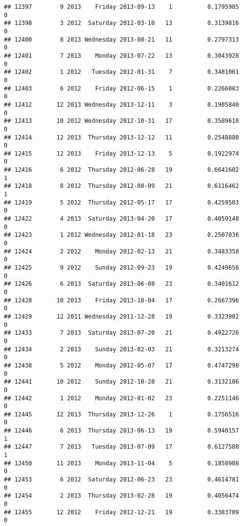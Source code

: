 \documentclass[
]{article}
\begin{document}
\begin{verbatim}
## 12397        9 2013    Friday 2013-09-13    1          0.1795985             0
## 12398        3 2012  Saturday 2012-03-10   13          0.3139816             0
## 12400        8 2013 Wednesday 2013-08-21   11          0.2797313             0
## 12401        7 2013    Monday 2013-07-22   13          0.3043928             0
## 12402        1 2012   Tuesday 2012-01-31    7          0.3481061             0
## 12403        6 2012    Friday 2012-06-15    1          0.2266083             0
## 12412       12 2013 Wednesday 2013-12-11    3          0.1905840             0
## 12413       10 2012 Wednesday 2012-10-31   17          0.3589618             0
## 12414       12 2013  Thursday 2013-12-12   11          0.2548880             0
## 12415       12 2013    Friday 2013-12-13    5          0.1922974             0
## 12416        6 2012  Thursday 2012-06-28   19          0.6641602             1
## 12418        8 2012  Thursday 2012-08-09   21          0.6116462             1
## 12419        5 2012  Thursday 2012-05-17   17          0.4259503             0
## 12422        4 2013  Saturday 2013-04-20   17          0.4059140             0
## 12423        1 2012 Wednesday 2012-01-18   23          0.2507836             0
## 12424        2 2012    Monday 2012-02-13   21          0.3483358             0
## 12425        9 2012    Sunday 2012-09-23   19          0.4249656             0
## 12426        6 2013  Saturday 2013-06-08   23          0.3401612             0
## 12428       10 2013    Friday 2013-10-04   17          0.2667396             0
## 12429       12 2011 Wednesday 2011-12-28   19          0.3323902             0
## 12433        7 2013  Saturday 2013-07-20   21          0.4922726             0
## 12434        2 2013    Sunday 2013-02-03   21          0.3213274             0
## 12438        5 2012    Monday 2012-05-07   17          0.4747298             0
## 12441       10 2012    Sunday 2012-10-28   21          0.3132186             0
## 12442        1 2012    Monday 2012-01-02   23          0.2251146             0
## 12445       12 2013  Thursday 2013-12-26    1          0.1756516             0
## 12446        6 2013  Thursday 2013-06-13   19          0.5940157             1
## 12447        7 2013   Tuesday 2013-07-09   17          0.6127588             1
## 12450       11 2013    Monday 2013-11-04    5          0.1858908             0
## 12453        6 2012  Saturday 2012-06-23   23          0.4614781             0
## 12454        2 2013  Thursday 2013-02-28   19          0.4056474             0
## 12455       12 2012    Friday 2012-12-21   19          0.3383709             0

\end{verbatim}
\end{document}
